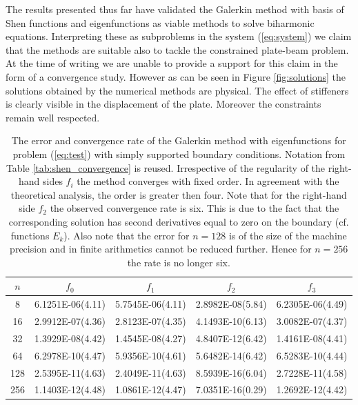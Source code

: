 \documentclass{marine_2015}
\begin{document}
  The results presented thus far have validated the Galerkin method with basis
  of Shen functions and eigenfunctions as viable methods to solve biharmonic
  equations. Interpreting these as subproblems in the system (\ref{eq:system}) we
  claim that the methods are suitable also to tackle the constrained plate-beam
  problem. At the time of writing we are unable to provide a support for this claim in
  the form of a convergence study. However as can be seen in Figure \ref{fig:solutions} 
  the solutions obtained by the numerical methods are physical. The effect of
  stiffeners is clearly visible in the displacement of the plate. Moreover the 
  constraints remain well respected.
\begin{table}[t!]
    \begin{center}
    \begin{tabular}{ccccc}
\hline
$n$  &  $f_0$  & $f_1$ & $f_2$ & $f_3$\\
\hline
8    & 6.1251E-06(4.11) & 5.7545E-06(4.11) & 2.8982E-08(5.84)& 6.2305E-06(4.49) \\
16   & 2.9912E-07(4.36) & 2.8123E-07(4.35) & 4.1493E-10(6.13)& 3.0082E-07(4.37) \\
32   & 1.3929E-08(4.42) & 1.4545E-08(4.27) & 4.8407E-12(6.42)& 1.4161E-08(4.41) \\
64   & 6.2978E-10(4.47) & 5.9356E-10(4.61) & 5.6482E-14(6.42)& 6.5283E-10(4.44) \\
128  & 2.5395E-11(4.63) & 2.4049E-11(4.63) & 8.5939E-16(6.04)& 2.7228E-11(4.58) \\
256  & 1.1403E-12(4.48) & 1.0861E-12(4.47) & 7.0351E-16(0.29)& 1.2692E-12(4.42) \\
\hline
\hline
    \end{tabular}
    \caption{The error and convergence rate of the Galerkin method with eigenfunctions for
    problem (\ref{eq:test}) with simply supported boundary conditions. Notation
    from Table \ref{tab:shen_convergence} is reused. Irrespective of the regularity of 
    the right-hand sides $f_i$ the method converges with fixed order. In agreement 
    with the theoretical analysis, the order is greater then four. Note that for 
    the right-hand side $f_2$ the observed convergence rate is six. This is due 
    to the fact that the corresponding solution has second derivatives equal to 
    zero on the boundary (cf. functions $E_k$). Also note that the error for 
    $n=128$ is of the size of the machine precision and in finite arithmetics 
    cannot be reduced further. Hence for $n=256$ the rate is no longer six.}
  \label{tab:sine_convergence}
  \end{center}
  \end{table}
\end{document}
